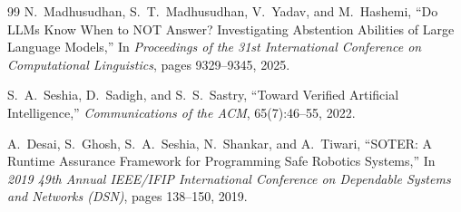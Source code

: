 \documentclass[11pt]{article}
\renewcommand{\_}{\textunderscore\hspace{0pt}}
\begin{document}
\begin{thebibliography}{99}
N.~Madhusudhan, S.~T.~Madhusudhan, V.~Yadav, and M.~Hashemi,
\newblock ``Do LLMs Know When to NOT Answer? Investigating Abstention Abilities of Large Language Models,''
\newblock In \emph{Proceedings of the 31st International Conference on Computational Linguistics}, pages 9329--9345, 2025.

S.~A.~Seshia, D.~Sadigh, and S.~S.~Sastry,
\newblock ``Toward Verified Artificial Intelligence,''
\newblock \emph{Communications of the ACM}, 65(7):46--55, 2022.

A.~Desai, S.~Ghosh, S.~A.~Seshia, N.~Shankar, and A.~Tiwari,
\newblock ``SOTER: A Runtime Assurance Framework for Programming Safe Robotics Systems,''
\newblock In \emph{2019 49th Annual IEEE/IFIP International Conference on Dependable Systems and Networks (DSN)}, pages 138--150, 2019.

\end{thebibliography}
\end{document}
